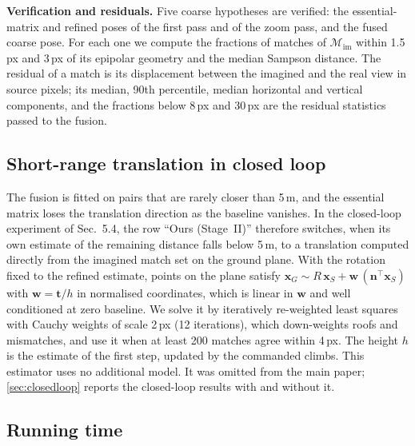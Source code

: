\noindent\textbf{Verification and residuals.} Five coarse hypotheses are verified: the essential-matrix and refined poses of the first pass and of the zoom pass, and the fused coarse pose. For each one we compute the fractions of matches of $\mathcal{M}_{\mathrm{im}}$ within 1.5\,px and 3\,px of its epipolar geometry and the median Sampson distance. The residual of a match is its displacement between the imagined and the real view in source pixels; its median, 90th percentile, median horizontal and vertical components, and the fractions below 8\,px and 30\,px are the residual statistics passed to the fusion.

\subsection{Short-range translation in closed loop}
\label{sec:shortrange}

The fusion is fitted on pairs that are rarely closer than 5\,m, and the essential matrix loses the translation direction as the baseline vanishes. In the closed-loop experiment of Sec.~5.4, the row ``Ours (Stage~II)'' therefore switches, when its own estimate of the remaining distance falls below 5\,m, to a translation computed directly from the imagined match set on the ground plane. With the rotation fixed to the refined estimate, points on the plane satisfy $\mathbf{x}_G\sim R\,\mathbf{x}_S+\mathbf{w}\,(\mathbf{n}^{\!\top}\mathbf{x}_S)$ with $\mathbf{w}=\mathbf{t}/h$ in normalised coordinates, which is linear in $\mathbf{w}$ and well conditioned at zero baseline. We solve it by iteratively re-weighted least squares with Cauchy weights of scale 2\,px (12 iterations), which down-weights roofs and mismatches, and use it when at least 200 matches agree within 4\,px. The height $h$ is the estimate of the first step, updated by the commanded climbs. This estimator uses no additional model. It was omitted from the main paper; \cref{sec:closedloop} reports the closed-loop results with and without it.

\subsection{Running time}
\label{sec:runtime}



